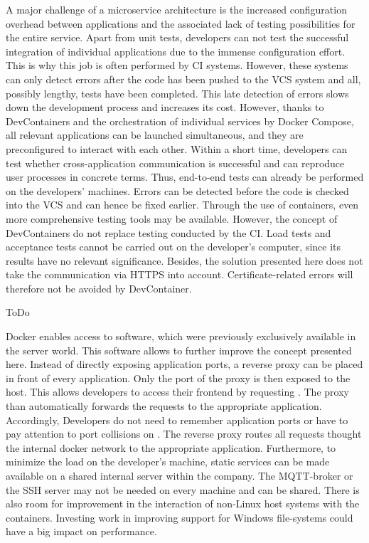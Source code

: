        A major challenge of a microservice architecture is the increased configuration overhead between applications and the associated lack of testing possibilities for the entire service. Apart from unit tests, developers can not test the successful integration of individual applications due to the immense configuration effort. This is why this job is often performed by \ac{CI} systems. However, these systems can only detect errors after the code has been pushed to the \ac{VCS} system and all, possibly lengthy, tests have been completed. This late detection of errors slows down the development process and increases its cost.\newline
        However, thanks to DevContainers and the orchestration of individual services by Docker Compose, all relevant applications can be launched simultaneous, and they are preconfigured to interact with each other. Within a short time, developers can test whether cross-application communication is successful and can reproduce user processes in concrete terms. Thus, end-to-end tests can already be performed on the developers' machines. Errors can be detected before the code is checked into the \ac{VCS} and can hence be fixed earlier. Through the use of containers, even more comprehensive testing tools may be available.\newline
        However, the concept of DevContainers do not replace testing conducted by the \ac{CI}. Load tests and acceptance tests cannot be carried out on the developer's computer, since its results have no relevant significance. Besides, the solution presented here does not take the communication via HTTPS into account. Certificate-related errors will therefore not be avoided by DevContainer.

        ToDo

        Docker enables access to software, which were previously exclusively available in the server world. This software allows to further improve the concept presented here. Instead of directly exposing application ports, a reverse proxy can be placed in front of every application. Only the port of the proxy is then exposed to the host. This allows developers to access their frontend by requesting . The proxy than automatically forwards the requests to the appropriate application. Accordingly, Developers do not need to remember application ports or have to pay attention to port collisions on . The reverse proxy routes all requests thought the internal docker network to the appropriate application. Furthermore, to minimize the load on the developer's machine, static services can be made available on a shared internal server within the company. The MQTT-broker or the \ac{SSH} server may not be needed on every machine and can be shared. There is also room for improvement in the interaction of non-Linux host systems with the containers. Investing work in improving support for Windows file-systems could have a big impact on performance.


